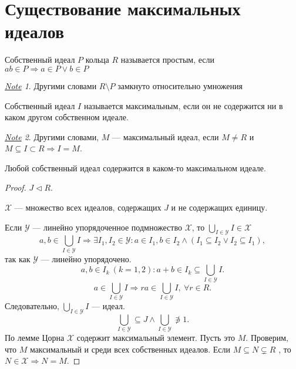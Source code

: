 \documentclass[11pt]{book}
\theoremstyle{definition}
\theoremstyle{plain}
\theoremstyle{plain}
\theoremstyle{definition}
\theoremstyle{remark}
\newtheorem*{note}{\underline{Note}}
\begin{document}
\section{Существование максимальных идеалов}
\begin{defn}
    Собственный идеал $ P$ кольца $ R$ называется простым, если $ ab \in  P \Rightarrow a \in  P \vee b \in  P$
\end{defn}
\begin{note}
    Другими словами $ R \setminus P$ замкнуто относительно умножения
\end{note}
\begin{defn}
    Собственный идеал $ I$ называется {\sf максимальным}, если он не содержится ни в каком другом собственном идеале.
\end{defn}
\begin{note}
    Другими словами, $ M$ --- максимальный идеал, если $ M \ne R$ и $ M \subseteq I \subset R \Rightarrow I = M$.
\end{note}
\begin{thm}
    Любой собственный идеал содержится в каком-то максимальном идеале.
\end{thm}
\begin{proof}
    $ J \vartriangleleft R$. %

    $ \mathcal{X}$ --- множество всех идеалов, содержащих $ J$ и не содержащих единицу.

    Если $\mathcal{Y}$ --- линейно упорядоченное подмножество $ \mathcal{X}$, то $ \bigcup_{I \in \mathcal{Y}} I \in \mathcal{X}$
    \[
	a, b \in  \bigcup_{I \in \mathcal{Y}} I \Longrightarrow \exists I_1, I_2 \in \mathcal{Y}: a \in  I_1, b \in I_2 \wedge (I_1 \subseteq I_2 \vee I_2 \subseteq I_1)
    ,\]
    так как $\mathcal{Y}$ --- линейно упорядочено.
    \[
	a, b \in  I_k ~(k = 1, 2): a+b \in  I_k \subseteq \bigcup_{I \in \mathcal{Y}}  I
    .\]
    \[
	a \in  \bigcup_{I \in  \mathcal Y} I \Longrightarrow ra \in  \bigcup_{I \in  \mathcal Y} I, ~ \forall r \in  R
    .\]
    Следовательно, $ \bigcup_{I \in \mathcal{Y}} I $ --- идеал.
    \[
	\bigcup_{I \in\mathcal{Y}} \subseteq J \wedge \bigcup_{ I \in \mathcal{Y}} \not\ni 1
    .\]
    По лемме Цорна $ \mathcal{X}$ содержит максимальный элемент. Пусть это $ M$.
    Проверим, что $ M$ максимальный и среди всех собственных идеалов.
    Если $ M \subseteq N \subsetneq R$ %
    , то $ N \in  \mathcal{X} \Rightarrow  N = M$.
\end{proof}
\end{document}
